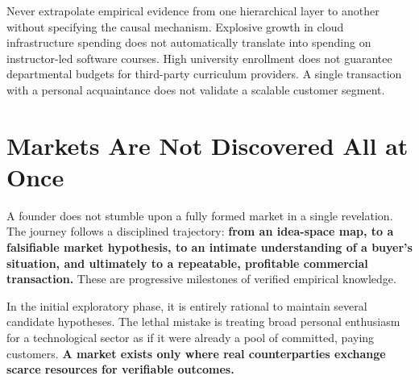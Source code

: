 Never extrapolate empirical evidence from one hierarchical layer to another without specifying the causal mechanism. Explosive growth in cloud infrastructure spending does not automatically translate into spending on instructor-led software courses. High university enrollment does not guarantee departmental budgets for third-party curriculum providers. A single transaction with a personal acquaintance does not validate a scalable customer segment.

\section{Markets Are Not Discovered All at Once}

A founder does not stumble upon a fully formed market in a single revelation. The journey follows a disciplined trajectory: \textbf{from an idea-space map, to a falsifiable market hypothesis, to an intimate understanding of a buyer's situation, and ultimately to a repeatable, profitable commercial transaction.} These are progressive milestones of verified empirical knowledge.

In the initial exploratory phase, it is entirely rational to maintain several candidate hypotheses. The lethal mistake is treating broad personal enthusiasm for a technological sector as if it were already a pool of committed, paying customers. \textbf{A market exists only where real counterparties exchange scarce resources for verifiable outcomes.}
